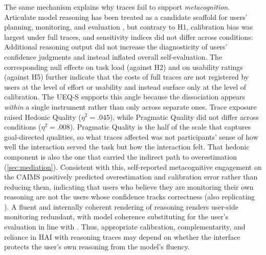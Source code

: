 \documentclass[manuscript,review,anonymous]{acmart}
\begin{document}
The same mechanism explains why traces fail to support \textit{metacognition}. Articulate model reasoning has been treated as a candidate scaffold for users' planning, monitoring, and evaluation \cite{FERNANDES2026108779}, but contrary to H1, calibration bias was largest under full traces, and sensitivity indices did not differ across conditions: Additional reasoning output did not increase the diagnosticity of users' confidence judgments and instead inflated overall self-evaluation. The corresponding null effects on task load (against H2) and on usability ratings (against H5) further indicate that the costs of full traces are not registered by users at the level of effort or usability and instead surface only at the level of calibration. 
The UEQ-S supports this angle because the dissociation appears
\emph{within} a single instrument rather than only across separate ones.
Trace exposure raised Hedonic Quality ($\eta^2 = .045$), while Pragmatic
Quality did not differ across conditions ($\eta^2 = .008$). Pragmatic
Quality is the half of the scale that captures goal-directed qualities, so what traces affected was not
participants' sense of how well the interaction served the task but how
the interaction felt. That hedonic component is also the one that carried
the indirect path to overestimation (\autoref{sec:mediation}).
Consistent with this, self-reported metacognitive engagement on the CAIMS positively predicted overestimation and calibration error rather than reducing them, indicating that users who believe they are monitoring their own reasoning are not the users whose confidence tracks correctness (also replicating \cite{FERNANDES2026108779}). A fluent and internally coherent rendering of reasoning renders user-side monitoring redundant, with model coherence substituting for the user's evaluation in line with \citet{alter2009uniting}. Thus, appropriate calibration, complementarity, and reliance in HAI with reasoning traces may depend on whether the interface protects the user's own reasoning from the model's fluency.

\end{document}
